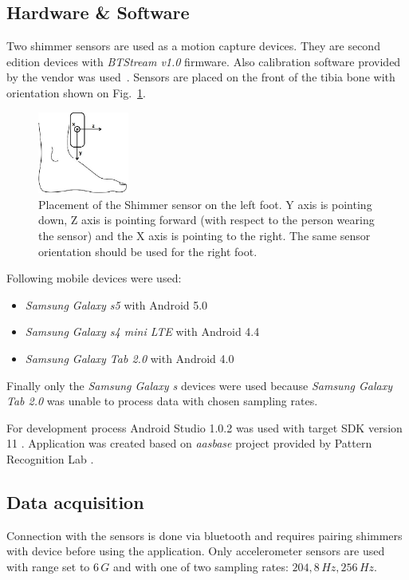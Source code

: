 \documentclass[conference]{IEEEtran}
\begin{document}
\subsection{Hardware \& Software}
Two shimmer sensors are used as a motion capture devices.
They are second edition devices with \emph{BTStream v1.0} firmware. Also calibration software provided by the vendor was used~\cite{ShimmerCalibration}.
Sensors are placed on the front of the tibia bone with orientation shown on Fig.~\ref{fig:ShimmerPlacement}.

\begin{figure}[!h]
    \centering
    \includegraphics[width=3cm]{Images/Foot.jpg}
    \caption{Placement of the Shimmer sensor on the left foot.
    Y axis is pointing down, Z axis is pointing forward (with respect to the person wearing the sensor) and the X axis is pointing to the right. The same sensor orientation should be used for the right foot.}
    \label{fig:ShimmerPlacement}
\end{figure}

Following mobile devices were used:
\begin{itemize}
    \item \emph{Samsung Galaxy s5} with Android 5.0
    \item \emph{Samsung Galaxy s4 mini LTE} with Android 4.4
    \item \emph{Samsung Galaxy Tab 2.0} with Android 4.0
\end{itemize}
Finally only the \emph{Samsung Galaxy s} devices were used because \emph{Samsung Galaxy Tab 2.0} was unable to process data with chosen sampling rates.

For development process Android Studio 1.0.2 was used with target SDK version 11 \cite{AndroidStudio}. 
Application was created based on \emph{aasbase} project provided by Pattern Recognition Lab \cite{CS5}.


\subsection{Data acquisition}
Connection with the sensors is done via bluetooth and requires pairing shimmers with device before using the application.
Only accelerometer sensors are used with range set to $6\,G$ and with one of two sampling rates: $204,8\,Hz, 256\,Hz$.
\end{document}
